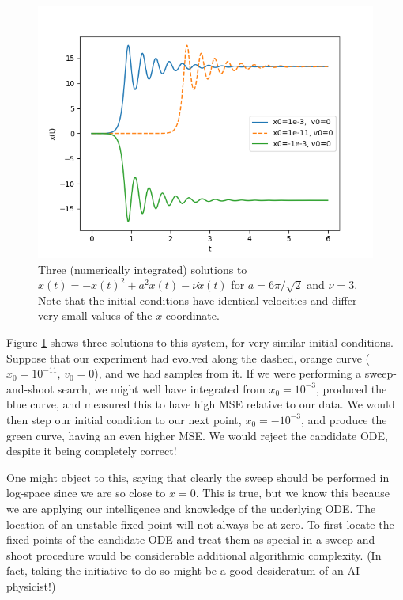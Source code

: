 \documentclass{article}
\begin{document}
\begin{figure}
\includegraphics{images/alternative_methods/double_well.png}
\centering
\caption{
Three (numerically integrated) solutions to $\ddot{x}(t) = -x(t)^2 + a^2 x(t) - \nu \dot{x}(t)$ for $a = 6\pi / \sqrt{2}$ and $\nu = 3$.
Note that the initial conditions have identical velocities and differ very small values of the $x$ coordinate.
}
\label{fig:double_well}
\end{figure}

Figure \ref{fig:double_well} shows three solutions to this system, for very similar initial conditions.
Suppose that our experiment had evolved along the dashed, orange curve ($x_0 = 10^{-11}$, $v_0 = 0$), and we had samples from it.
If we were performing a sweep-and-shoot search, we might well have integrated from $x_0 = 10^{-3}$, produced the blue curve, and measured this to have high MSE relative to our data.
We would then step our initial condition to our next point, $x_0 = -10^{-3}$, and produce the green curve, having an even higher MSE.
We would reject the candidate ODE, despite it being completely correct!

One might object to this, saying that clearly the sweep should be performed in log-space since we are so close to $x=0$.
This is true, but we know this because we are applying our intelligence and knowledge of the underlying ODE.
The location of an unstable fixed point will not always be at zero.
To first locate the fixed points of the candidate ODE and treat them as special in a sweep-and-shoot procedure would be considerable additional algorithmic complexity.
(In fact, taking the initiative to do so might be a good desideratum of an AI physicist!)
\end{document}
